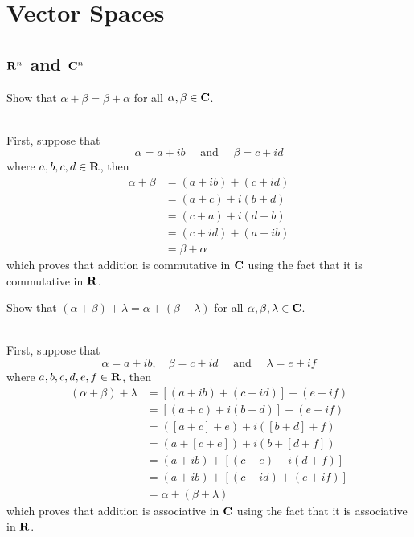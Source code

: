 \chapter{Vector Spaces}
\section{$\mathbf{R}^n$ and $\mathbf{C}^n$}

\begin{exercise}
    Show that $\alpha + \beta = \beta + \alpha$ for all $\alpha, \beta \in \mathbf{C}$. \\
\end{exercise}

\begin{solution}
    \\ First, suppose that
    $$\alpha = a+ ib \quad \text{ and } \quad \beta = c + id$$
    where $a,b,c,d \in \mathbf{R}$, then
    \begin{align*}
        \alpha + \beta &= (a + ib) + (c + id) \\
        &= (a + c) + i(b + d) \\
        &= (c + a) + i(d + b) \\
        &= (c + id) + (a + ib) \\
        &= \beta + \alpha
    \end{align*}
    which proves that addition is commutative in $\mathbf{C}$ using the fact that it is commutative in $\mathbf{R}$. \\
\end{solution}

\begin{exercise}
    Show that $(\alpha + \beta) + \lambda = \alpha + (\beta + \lambda)$ for all $\alpha, \beta, \lambda \in \mathbf{C}$. \\
\end{exercise}

\begin{solution}
    \\ First, suppose that
    $$\alpha = a+ ib, \quad \beta = c + id \quad \text{ and } \quad \lambda = e + if$$
    where $a,b,c,d,e,f \in \mathbf{R}$, then
    \begin{align*}
        (\alpha + \beta) + \lambda &= [(a + ib) + (c + id)] + (e + if) \\
        &= [(a + c) + i(b + d)] + (e + if) \\
        &= ([a + c] + e) + i([b + d] + f) \\
        &= (a + [c + e]) + i(b + [d + f]) \\
        &= (a + ib) + [(c + e) + i(d + f)] \\
        &= (a + ib) + [(c + id) + (e + if)] \\
        &= \alpha + (\beta + \lambda)
    \end{align*}
    which proves that addition is associative in $\mathbf{C}$ using the fact that it is associative in $\mathbf{R}$. \\
\end{solution}

